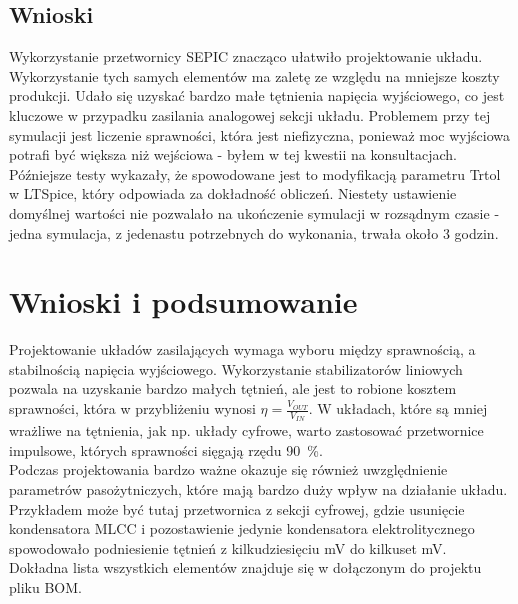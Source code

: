 \documentclass[11pt]{article}
\begin{document}
\subsection{Wnioski}
Wykorzystanie przetwornicy SEPIC znacząco ułatwiło projektowanie układu. Wykorzystanie tych samych elementów ma zaletę ze względu na mniejsze koszty produkcji. Udało się uzyskać bardzo małe tętnienia napięcia wyjściowego, co jest kluczowe w przypadku zasilania analogowej sekcji układu. Problemem przy tej symulacji jest liczenie sprawności, która jest niefizyczna, ponieważ moc wyjściowa potrafi być większa niż wejściowa - byłem w tej kwestii na konsultacjach. Późniejsze testy wykazały, że spowodowane jest to modyfikacją parametru Trtol w LTSpice, który odpowiada za dokładność obliczeń. Niestety ustawienie domyślnej wartości nie pozwalało na ukończenie symulacji w rozsądnym czasie - jedna symulacja, z jedenastu potrzebnych do wykonania, trwała około 3 godzin.

\section{Wnioski i podsumowanie}
Projektowanie układów zasilających wymaga wyboru między sprawnością, a stabilnością napięcia wyjściowego. Wykorzystanie stabilizatorów liniowych pozwala na uzyskanie bardzo małych tętnień, ale jest to robione kosztem sprawności, która w przybliżeniu wynosi $\eta = \frac{V_{OUT}}{V_{IN}}$. W układach, które są mniej wrażliwe na tętnienia, jak np. układy cyfrowe, warto zastosować przetwornice impulsowe, których sprawności sięgają rzędu \SI{90}{\percent}.\\
Podczas projektowania bardzo ważne okazuje się również uwzględnienie parametrów pasożytniczych, które mają bardzo duży wpływ na działanie układu. Przykładem może być tutaj przetwornica z sekcji cyfrowej, gdzie usunięcie kondensatora MLCC i pozostawienie jedynie kondensatora elektrolitycznego spowodowało podniesienie tętnień z kilkudziesięciu mV do kilkuset mV.\\
Dokładna lista wszystkich elementów znajduje się w dołączonym do projektu pliku BOM.
\end{document}
